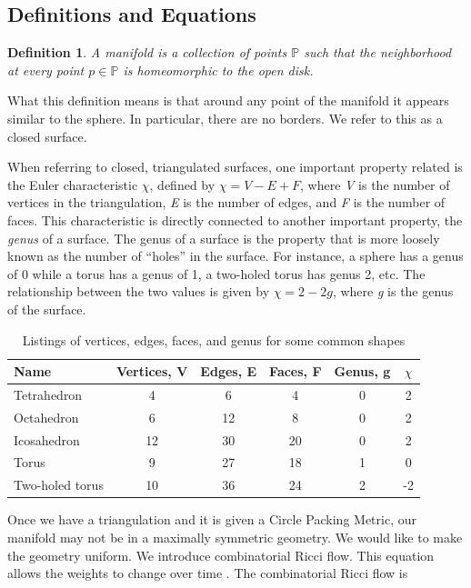 \documentclass[12pt]{article}
\newtheorem{definition}[theorem]{Definition}
\begin{document}
\subsection{Definitions and Equations}
\label{ricciDef}

\begin{definition}
A manifold is a collection of points $\mathbb{P}$ such that the neighborhood at every point $p\in\mathbb{P}$ is homeomorphic to the open disk.
\end{definition}

\noindent What this definition means is that around any point of the manifold it appears similar to the sphere. In particular, there are no borders. We refer to this as a closed surface.\newline

\noindent When referring to closed, triangulated surfaces, one important property related is the Euler characteristic $\chi$, defined by $\chi = V - E + F$, where \textit{V} is the number of vertices in the triangulation, \textit{E} is the number of edges, and \textit{F} is the number of faces. This characteristic is directly connected to another important property, the \textit{genus} of a surface. The genus of a surface is the property that is more loosely known as the number of ``holes'' in the surface. For instance, a sphere has a genus of 0 while a torus has a genus of 1, a two-holed torus has genus 2, etc. The relationship between the two values is given by $\chi = 2 - 2g$, where \textit{g} is the genus of the surface.\newline 

\begin{table}
\begin{tabular}{lccccc}
Name  &	Vertices, V &	Edges, E & Faces, F &	Genus, g & $\chi$\\
\hline 
Tetrahedron &	4 &	6 &	4 &	0 & 2\\
Octahedron 	&	6 &	12 &	8 & 0 &	 2\\
Icosahedron &	12 & 30 & 20 & 0	&	 2\\
Torus & 9 & 27 & 18 &	1 & 0\\
Two-holed torus & 10 & 36 & 24 &	2 & -2\\
\end{tabular}
\caption{Listings of vertices, edges, faces, and genus for some common shapes}
\label{EuChar}
\end{table}

\noindent Once we have a triangulation and it is given a Circle Packing Metric, our manifold may not be in a maximally symmetric geometry. We would like to make the geometry uniform. We introduce combinatorial Ricci flow. This equation allows the weights to change over time \cite{chowluo}. The combinatorial Ricci flow is
\end{document}
